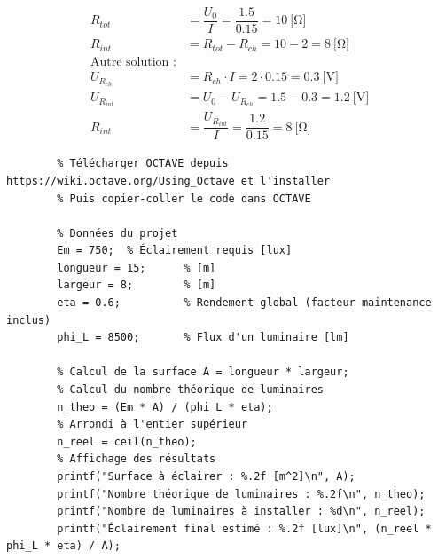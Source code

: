 \documentclass[a4paper,11pt,answers,addpoints]{exam}
\begin{document}
\begin{questions}
\begin{center}
\end{center}

\begin{solution} 
	\begin{align*} 
		R_{tot} &= \dfrac{U_0}{I} = \dfrac{1.5}{0.15} = \qty{10}{[\ohm]}\\[6pt] 
		R_{int} &= R_{tot} - R_{ch} = \num{10} - \num{2} = \qty{8}{[\ohm]}\\[6pt]
		\text{Autre solution~:}\\
		U_{R_{ch}} &= R_{ch} \cdot I = \num{2} \cdot \num{0.15} = \qty{0.3}{[\volt]}\\[6pt] 
		U_{R_{int}} &= U_0 - U_{R_{ch}} = \num{1.5} - \num{0.3} = \qty{1.2}{[\volt]}\\
		R_{int} &= \dfrac{U_{R_{int}}}{I} = \dfrac{1.2}{0.15} = \qty{8}{[\ohm]}
	\end{align*}
	\begin{verbatim} 
		% Télécharger OCTAVE depuis https://wiki.octave.org/Using_Octave et l'installer 
		% Puis copier-coller le code dans OCTAVE
		
		% Données du projet 
		Em = 750;  % Éclairement requis [lux] 
		longueur = 15;      % [m] 
		largeur = 8;        % [m] 
		eta = 0.6;          % Rendement global (facteur maintenance inclus) 
		phi_L = 8500;       % Flux d'un luminaire [lm]
		
		% Calcul de la surface A = longueur * largeur;
		% Calcul du nombre théorique de luminaires 
		n_theo = (Em * A) / (phi_L * eta);
		% Arrondi à l'entier supérieur 
		n_reel = ceil(n_theo);
		% Affichage des résultats 
		printf("Surface à éclairer : %.2f [m^2]\n", A); 
		printf("Nombre théorique de luminaires : %.2f\n", n_theo); 
		printf("Nombre de luminaires à installer : %d\n", n_reel); 
		printf("Éclairement final estimé : %.2f [lux]\n", (n_reel * phi_L * eta) / A); 
	\end{verbatim} 
\end{solution}
\end{questions}
\end{document}
